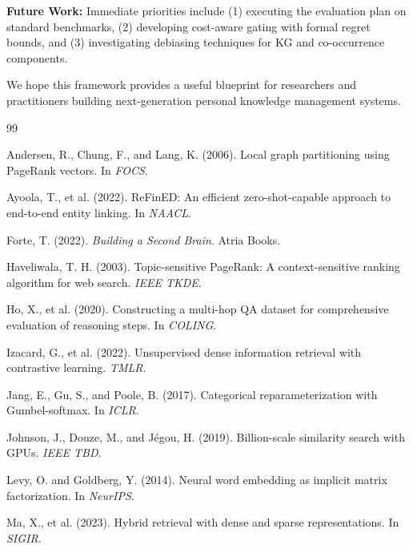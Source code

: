 \documentclass[11pt,a4paper]{article}
\begin{document}
\textbf{Future Work:} Immediate priorities include (1) executing the evaluation plan on standard benchmarks, (2) developing cost-aware gating with formal regret bounds, and (3) investigating debiasing techniques for KG and co-occurrence components.

We hope this framework provides a useful blueprint for researchers and practitioners building next-generation personal knowledge management systems.


\begin{thebibliography}{99}

Andersen, R., Chung, F., and Lang, K. (2006).
Local graph partitioning using PageRank vectors.
In \textit{FOCS}.

Ayoola, T., et al. (2022).
ReFinED: An efficient zero-shot-capable approach to end-to-end entity linking.
In \textit{NAACL}.

Forte, T. (2022).
\textit{Building a Second Brain}.
Atria Books.

Haveliwala, T. H. (2003).
Topic-sensitive PageRank: A context-sensitive ranking algorithm for web search.
\textit{IEEE TKDE}.

Ho, X., et al. (2020).
Constructing a multi-hop QA dataset for comprehensive evaluation of reasoning steps.
In \textit{COLING}.

Izacard, G., et al. (2022).
Unsupervised dense information retrieval with contrastive learning.
\textit{TMLR}.

Jang, E., Gu, S., and Poole, B. (2017).
Categorical reparameterization with Gumbel-softmax.
In \textit{ICLR}.

Johnson, J., Douze, M., and Jégou, H. (2019).
Billion-scale similarity search with GPUs.
\textit{IEEE TBD}.

Levy, O. and Goldberg, Y. (2014).
Neural word embedding as implicit matrix factorization.
In \textit{NeurIPS}.

Ma, X., et al. (2023).
Hybrid retrieval with dense and sparse representations.
In \textit{SIGIR}.


\end{thebibliography}
\end{document}
